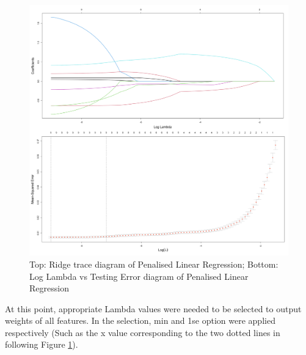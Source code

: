 \begin{figure}[htbp]
    \center
    \includegraphics[scale=0.4]{Figure/4.2.2-NEW-PLR-ridge-trance-Log-Lambda.png}
    \caption{Top: Ridge trace diagram of Penalised Linear Regression; Bottom: Log Lambda vs Testing Error diagram of Penalised Linear Regression}
    \label{4.2.2-NEW-PLR-ridge-trance-Log-Lambda}
\end{figure}


At this point, appropriate Lambda values were needed to be selected to output weights of all features. In the selection, min and 1se option were applied respectively (Such as the x value corresponding to the two dotted lines in following Figure \ref{4.2.2-NEW-PLR-ridge-trance-Log-Lambda}).


